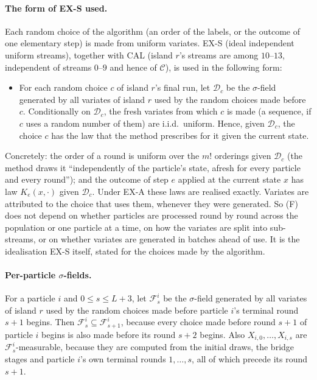 \documentclass[11pt]{article}
\theoremstyle{remark}
\newcommand{\C}{\mathcal C}
\begin{document}
\paragraph{The form of EX-S used.} Each random choice of the algorithm (an order of the labels, or the outcome of one elementary step) is made from uniform variates. EX-S (ideal independent uniform streams), together with CAL (island $r$'s streams are among $10$--$13$, independent of streams $0$--$9$ and hence of $\C$), is used in the following form:
\begin{itemize}
\item[(F)] For each random choice $c$ of island $r$'s final run, let $\mathcal D_c$ be the $\sigma$-field generated by all variates of island $r$ used by the random choices made before $c$. Conditionally on $\mathcal D_c$, the fresh variates from which $c$ is made (a sequence, if $c$ uses a random number of them) are i.i.d.\ uniform. Hence, given $\mathcal D_c$, the choice $c$ has the law that the method prescribes for it given the current state.
\end{itemize}
Concretely: the order of a round is uniform over the $m!$ orderings given $\mathcal D_c$ (the method draws it ``independently of the particle's state, afresh for every particle and every round''); and the outcome of step $e$ applied at the current state $x$ has law $K_e(x,\cdot)$ given $\mathcal D_c$. Under EX-A these laws are realised exactly. Variates are attributed to the choice that uses them, whenever they were generated. So (F) does not depend on whether particles are processed round by round across the population or one particle at a time, on how the variates are split into sub-streams, or on whether variates are generated in batches ahead of use. It is the idealisation EX-S itself, stated for the choices made by the algorithm.

\paragraph{Per-particle $\sigma$-fields.} For a particle $i$ and $0\le s\le L+3$, let $\mathcal F^i_s$ be the $\sigma$-field generated by all variates of island $r$ used by the random choices made before particle $i$'s terminal round $s+1$ begins. Then $\mathcal F^i_s\subseteq\mathcal F^i_{s+1}$, because every choice made before round $s+1$ of particle $i$ begins is also made before its round $s+2$ begins. Also $X_{i,0},\dots,X_{i,s}$ are $\mathcal F^i_s$-measurable, because they are computed from the initial draws, the bridge stages and particle $i$'s own terminal rounds $1,\dots,s$, all of which precede its round $s+1$.
\end{document}
